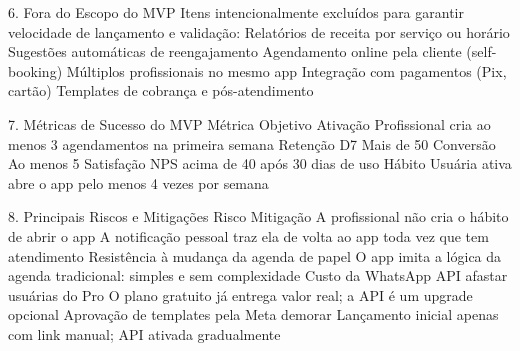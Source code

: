 6. Fora do Escopo do MVP
Itens intencionalmente excluídos para garantir velocidade de lançamento e validação:
Relatórios de receita por serviço ou horário
Sugestões automáticas de reengajamento
Agendamento online pela cliente (self-booking)
Múltiplos profissionais no mesmo app
Integração com pagamentos (Pix, cartão)
Templates de cobrança e pós-atendimento

7. Métricas de Sucesso do MVP
Métrica
Objetivo
Ativação
Profissional cria ao menos 3 agendamentos na primeira semana
Retenção D7
Mais de 50%
Conversão
Ao menos 5%
Satisfação
NPS acima de 40 após 30 dias de uso
Hábito
Usuária ativa abre o app pelo menos 4 vezes por semana


8. Principais Riscos e Mitigações
Risco
Mitigação
A profissional não cria o hábito de abrir o app
A notificação pessoal traz ela de volta ao app toda vez que tem atendimento
Resistência à mudança da agenda de papel
O app imita a lógica da agenda tradicional: simples e sem complexidade
Custo da WhatsApp API afastar usuárias do Pro
O plano gratuito já entrega valor real; a API é um upgrade opcional
Aprovação de templates pela Meta demorar
Lançamento inicial apenas com link manual; API ativada gradualmente


